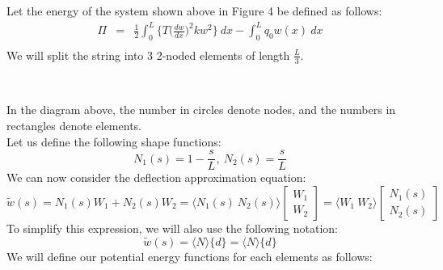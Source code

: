 \documentclass[a4paper]{article}
\begin{document}
Let the energy of the system shown above in Figure 4 be defined as follows:
\begin{eqnarray*}
\Pi & = & \frac{1}{2}\int_{0}^{L} \Big\{T\Big( \frac{dw}{dx}\Big)^{2} kw^{2} \Big\} \ dx - \int_{0}^{L}q_{0} w(x) \ dx\\
\end{eqnarray*}
We will split the string into 3 2-noded elements of length $\frac{L}{3}$. \\
\begin{center}
\\
\end{center}
In the diagram above, the number in circles denote nodes, and the numbers in rectangles denote elements.\\
Let us define the following shape functions: 
$$N_{1}(s)  =  1 - \frac{s}{L}, \
N_{2}(s)  =  \frac{s}{L}$$
We can now consider the deflection approximation equation:
$$\widetilde{w}(s) = N_{1}(s)W_{1}+N_{2}(s)W_{2} = \langle N_{1}(s) \ N_{2}(s) \rangle \begin{bmatrix}
W_{1}\\
W_{2}
\end{bmatrix} = \langle W_{1} \ W_{2} \rangle \begin{bmatrix}
N_{1}(s)\\
N_{2}(s)
\end{bmatrix}$$
To simplify this expression, we will also use the following notation:
$$\widetilde{w}(s) = \langle N \rangle \{ d \} = \langle N \rangle \{ d \}$$
We will define our potential energy functions for each elements as follows:
\end{document}
